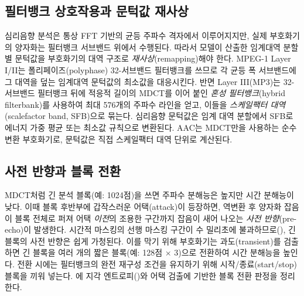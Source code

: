 \documentclass[11pt,a4paper]{article}
\begin{document}
\subsection{필터뱅크 상호작용과 문턱값 재사상}
심리음향 분석은 통상 FFT 기반의 균등 주파수 격자에서 이루어지지만, 실제 부호화기의
양자화는 필터뱅크 서브밴드 위에서 수행된다. 따라서 모델이 산출한 임계대역
분할별 문턱값을 부호화기의 대역 구조로 \emph{재사상}(remapping)해야 한다. MPEG-1
Layer I/II는 폴리페이즈(polyphase) 32-서브밴드 필터뱅크를 쓰므로 각 균등 폭
서브밴드에 그 대역을 덮는 임계대역 문턱값의 최소값을 대응시킨다. 반면 Layer
III(MP3)는 32-서브밴드 필터뱅크 뒤에 적응적 길이의 MDCT를 이어 붙인 \emph{혼성
필터뱅크}(hybrid filterbank)를 사용하여 최대 576개의 주파수 라인을 얻고, 이들을
\emph{스케일팩터 대역}(scalefactor band, SFB)으로 묶는다. 심리음향 문턱값은 임계
대역 분할에서 SFB로 에너지 가중 평균 또는 최소값 규칙으로 변환된다. AAC는 MDCT만을
사용하는 순수 변환 부호화기로, 문턱값은 직접 스케일팩터 대역 단위로 계산된다.

\subsection{사전 반향과 블록 전환}
MDCT처럼 긴 분석 블록(예: \num{1024}점)을 쓰면 주파수 분해능은 높지만 시간
분해능이 낮다. 이때 블록 후반부에 갑작스러운 어택(attack)이 등장하면, 역변환 후
양자화 잡음이 블록 전체로 퍼져 어택 \emph{이전}의 조용한 구간까지 잡음이 새어
나오는 \emph{사전 반향}(pre-echo)이 발생한다. 시간적 마스킹의 선행 마스킹 구간이
수 밀리초에 불과하므로(), 긴 블록의 사전 반향은 쉽게 가청된다.
이를 막기 위해 부호화기는 과도(transient)를 검출하면 긴 블록을 여러 개의 짧은
블록(예: \num{128}점 $\times$ 3)으로 전환하여 시간 분해능을 높인다. 전환 시에는
필터뱅크의 완전 재구성 조건을 유지하기 위해 시작/종료(start/stop) 블록을 끼워
넣는다. 에 지각 엔트로피()와 어택 검출에 기반한
블록 전환 판정을 정리한다.
\end{document}
